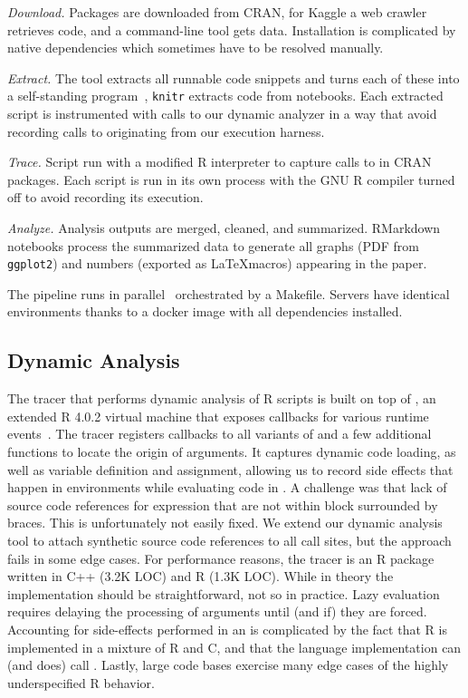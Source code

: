 \documentclass[screen,acmsmall]{acmart}%
\renewcommand{\k}[1]{\lstinline |#1|\xspace}
\begin{document}
\begin{compactenum}[(1)]
\item \emph{Download.} Packages are downloaded from CRAN, for Kaggle a web
  crawler retrieves code, and a command-line tool gets data. Installation is
  complicated by native dependencies which sometimes have to be resolved
  manually.
\item \emph{Extract.} The \genthat tool extracts all runnable code snippets and
  turns each of these into a self-standing program~\cite{issta18}, \k{knitr}
  extracts code from notebooks. Each extracted script is instrumented with calls
  to our dynamic analyzer in a way that avoid recording calls to \eval
  originating from our execution harness.
\item \emph{Trace.} Script run with a modified R interpreter to capture calls
  to \eval in CRAN packages. Each script is run in its own process with the GNU
  R compiler turned off to avoid recording its execution.
\item \emph{Analyze.} Analysis outputs are merged, cleaned, and summarized.
  RMarkdown notebooks process the summarized data to generate all graphs (PDF
  from \k{ggplot2}) and numbers (exported as \LaTeX macros) appearing in the
  paper.
\end{compactenum}

\medskip The pipeline runs in parallel~\cite{GNUparallel} orchestrated by a
Makefile. Servers have identical environments thanks to a docker image with all
dependencies installed.

\subsection{Dynamic Analysis}

The tracer that performs dynamic analysis of R scripts is built on top of
\rdyntrace, an extended R 4.0.2 virtual machine that exposes callbacks for
various runtime events~\cite{oopsla19b}. The tracer registers callbacks to all
variants of \eval and a few additional functions to locate the origin of \eval
arguments. It captures dynamic code loading, as well as variable definition and
assignment, allowing us to record side effects that happen in environments
while evaluating code in \eval. A challenge was that lack of source code
references for expression that are not within block surrounded by braces. This
is unfortunately not easily fixed. We extend our dynamic analysis tool to
attach synthetic source code references to all \eval call sites, but the
approach fails in some edge cases. For performance reasons, the tracer is an R
package written in C++ (3.2K LOC) and R (1.3K LOC). While in theory the
implementation should be straightforward, not so in practice. Lazy evaluation
requires delaying the processing of arguments until (and if) they are forced.
Accounting for side-effects performed in an \eval is complicated by the fact
that R is implemented in a mixture of R and C, and that the language
implementation can (and does) call \eval. Lastly, large code bases exercise
many edge cases of the highly underspecified R behavior.
\end{document}
